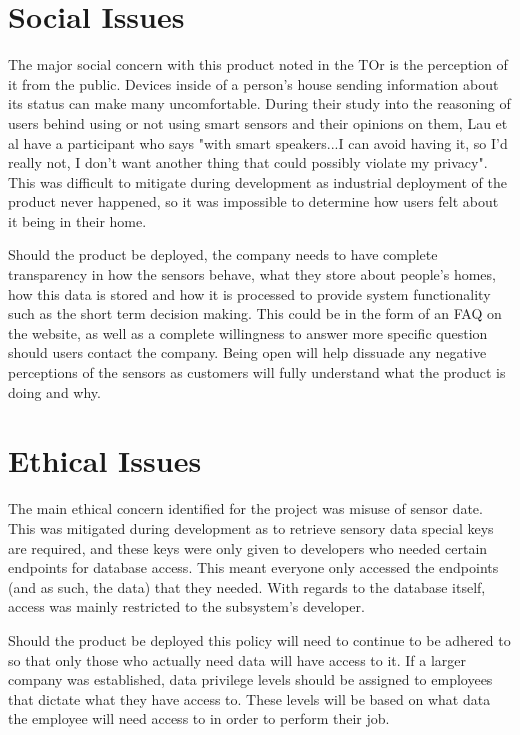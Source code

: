 \documentclass[]{report}
\begin{document}
\section{Social Issues}
The major social concern with this product noted in the TOr is the perception of it from the public. Devices inside of a person's house sending information about its status can make many uncomfortable. During their study into the reasoning of users behind using or not using smart sensors and their opinions on them, Lau et al\cite{lau2018alexa} have a participant who says "with smart speakers...I can avoid having it, so I’d really not, I don’t want another thing that could possibly violate my privacy". This was difficult to mitigate during development as industrial deployment of the product never happened, so it was impossible to determine how users felt about it being in their home.
\medskip

Should the product be deployed, the company needs to have complete transparency in how the sensors behave, what they store about people's homes, how this data is stored and how it is processed to provide system functionality such as the short term decision making. This could be in the form of an FAQ on the website, as well as a complete willingness to answer more specific question should users contact the company. Being open will help dissuade any negative perceptions of the sensors as customers will fully understand what the product is doing and why.

\section{Ethical Issues}
The main ethical concern identified for the project was misuse of sensor date. This was mitigated during development as to retrieve sensory data special keys are required, and these keys were only given to developers who needed certain endpoints for database access. This meant everyone only accessed the endpoints (and as such, the data) that they needed. With regards to the database itself, access was mainly restricted to the subsystem's developer.
\medskip

Should the product be deployed this policy will need to continue to be adhered to so that only those who actually need data will have access to it. If a larger company was established, data privilege levels should be assigned to employees that dictate what they have access to. These levels will be based on what data the employee will need access to in order to perform their job.
\end{document}
